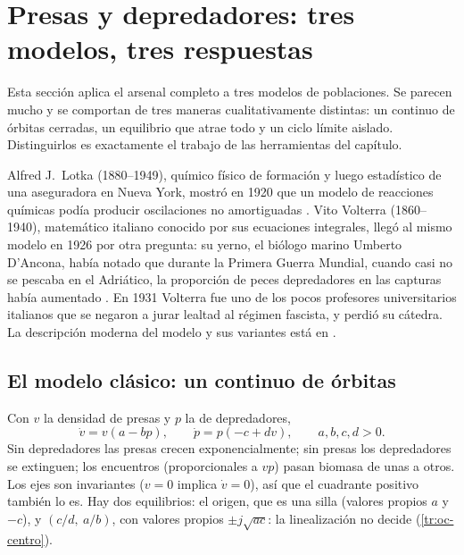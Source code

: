 \section{Presas y depredadores: tres modelos, tres respuestas}
\label{sec:oc-lotka}

Esta sección aplica el arsenal completo a tres modelos de poblaciones. Se parecen mucho y se comportan de tres maneras cualitativamente distintas: un continuo de órbitas cerradas, un equilibrio que atrae todo y un ciclo límite aislado. Distinguirlos es exactamente el trabajo de las herramientas del capítulo.

\begin{historia}
Alfred J.\ Lotka (1880--1949), químico físico de formación y luego estadístico de una aseguradora en Nueva York, mostró en 1920 que un modelo de reacciones químicas podía producir oscilaciones no amortiguadas \citep{Lot20b}. Vito Volterra (1860--1940), matemático italiano conocido por sus ecuaciones integrales, llegó al mismo modelo en 1926 por otra pregunta: su yerno, el biólogo marino Umberto D'Ancona, había notado que durante la Primera Guerra Mundial, cuando casi no se pescaba en el Adriático, la proporción de peces depredadores en las capturas había aumentado \citep{Vol26}. En 1931 Volterra fue uno de los pocos profesores universitarios italianos que se negaron a jurar lealtad al régimen fascista, y perdió su cátedra. La descripción moderna del modelo y sus variantes está en \citet{HoSi98}.
\end{historia}

\subsection{El modelo clásico: un continuo de órbitas}

Con $v$ la densidad de presas y $p$ la de depredadores,
\begin{equation}
  \dot v=v(a-bp),\qquad\dot p=p(-c+dv),\qquad a,b,c,d>0 .
  \label{eq:oc-lv}
\end{equation}
Sin depredadores las presas crecen exponencialmente; sin presas los depredadores se extinguen; los encuentros (proporcionales a $vp$) pasan biomasa de unas a otros. Los ejes son invariantes ($v=0$ implica $\dot v=0$), así que el cuadrante positivo también lo es. Hay dos equilibrios: el origen, que es una silla (valores propios $a$ y $-c$), y $(c/d,\ a/b)$, con valores propios $\pm j\sqrt{ac}$: la linealización no decide (\cref{tr:oc-centro}).

